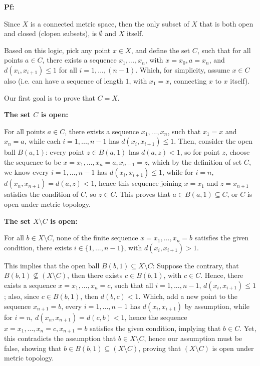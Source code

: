\documentclass{article}
\begin{document}
\textbf{Pf:}

Since $X$ is a connected metric space, then the only subset of $X$ that is both open and closed (clopen subsets), is $\emptyset$ and $X$ itself.

Based on this logic, pick any point $x\in X$, and define the set $C$, such that for all points $a\in C$,
there exists a sequence $x_1,...,x_n$, with $x=x_0, a=x_n$, and $d(x_i,x_{i+1})\leq 1$ for all $i=1,...,(n-1)$.
Which, for simplicity, assume $x\in C$ also (i.e. can have a sequence of length $1$, with $x_1 = x$, connecting $x$ to $x$ itself).

Our first goal is to prove that $C=X$.

\hfil

\textbf{The set $C$ is open:} 

For all points $a\in C$, there exists a sequence $x_1,...,x_n$, such that $x_1=x$ and $x_n=a$,
while each $i=1,...,n-1$ has $d(x_i,x_{i+1})\leq 1$. Then, consider the open ball $B(a,1)$: every point $z\in B(a,1)$ has $d(a,z)<1$,
so for point $z$, choose the sequence to be $x=x_1,...,x_n = a, x_{n+1}=z$, which by the definition of set $C$,
we know every $i=1,...,n-1$ has $d(x_i,x_{i+1})\leq 1$, while for $i=n$, $d(x_n,x_{n+1})=d(a,z)<1$,
hence this sequence joining $x=x_1$ and $z=x_{n+1}$ satisfies the condition of $C$, so $z\in C$.
This proves that $a\in B(a,1)\subseteq C$, or $C$ is open under metric topology.

\hfil

\textbf{The set $X\setminus C$ is open:}

For all $b\in X\setminus C$, none of the finite sequence $x=x_1,...,x_n=b$ satisfies the given condition, there exists $i\in \{1,...,n-1\}$,
with $d(x_i,x_{i+1})> 1$.

This implies that the open ball $B(b,1)\subseteq X\setminus C$: Suppose the contrary, that $B(b,1)\not\subseteq (X\setminus C)$, 
then there exists $c\in B(b,1)$, with $c\in C$. Hence, there exists a sequence $x=x_1,...,x_n=c$, such that all $i=1,...,n-1$, $d(x_i,x_{i+1})\leq 1$;
also, since $c\in B(b,1)$, then $d(b,c)<1$. 
Which, add a new point to the sequence $x_{n+1}=b$, every $i=1,...,n-1$ has $d(x_i,x_{i+1})$ by assumption,
while for $i=n$, $d(x_n,x_{n+1})=d(c,b)<1$, hence the sequence $x=x_1,...,x_n=c,x_{n+1}=b$ satisfies the given condition,
implying that $b\in C$. Yet, this contradicts the assumption that $b\in X\setminus C$, hence our assumption must be false,
showing that $b\in B(b,1)\subseteq (X\setminus C)$, proving that $(X\setminus C)$ is open under metric topology.
\end{document}
